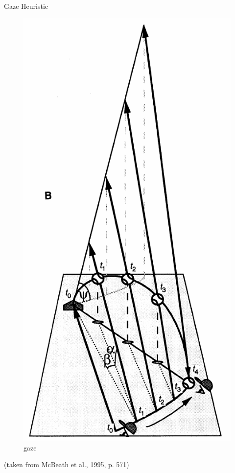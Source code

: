 \documentclass[
  ignorenonframetext,
]{beamer}
\begin{document}
\begin{frame}{Gaze Heuristic}
\protect\hypertarget{gaze-heuristic}{}
\begin{figure}

{\centering \includegraphics{resources/images/McBeath.png}

}

\caption{gaze}

\end{figure}

(taken from McBeath et al., 1995, p. 571)
\end{frame}
\end{document}
